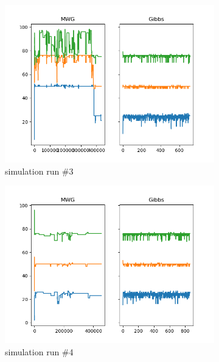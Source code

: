 \begin{figure}[H]
\begin{subfigure}{.3\textwidth}
    	\includegraphics[width=\linewidth]{../../plots/Trace_M4_N100_NMCMC3_seed2_diffind2.png}
    	\caption{simulation run \#3}
	\end{subfigure}
	\begin{subfigure}{.3\textwidth}
	    \centering
    	\includegraphics[width=\linewidth]{../../plots/Trace_M4_N100_NMCMC3_seed3_diffind2.png}
    	\caption{simulation run \#4}
	\end{subfigure}
	\begin{subfigure}{.3\textwidth}
	    \centering

\end{subfigure}
\end{figure}
